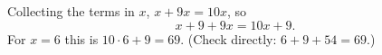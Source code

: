 Collecting the terms in $x$, $x+9x=10x$, so
\[x+9+9x=\boxed{10x+9}.\]
For $x=6$ this is $10\cdot6+9=\boxed{69}$. (Check directly: $6+9+54=69$.)
